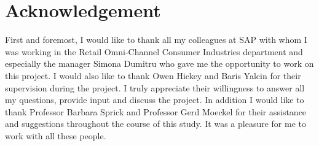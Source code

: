 \section*{Acknowledgement}
\label{sec:acknowledgement}

First and foremost, I would like to thank all my colleagues at SAP with whom I was working in the Retail Omni-Channel Consumer Industries department and especially the manager Simona Dumitru who gave me the opportunity to work on this project. I would also like to thank Owen Hickey and Baris Yalcin for their supervision during the project. I truly appreciate their willingness to answer all my questions, provide input and discuss the project. In addition I would like to thank Professor Barbara Sprick and Professor Gerd Moeckel for their assistance and suggestions throughout the course of this study. It was a pleasure for me to work with all these people.